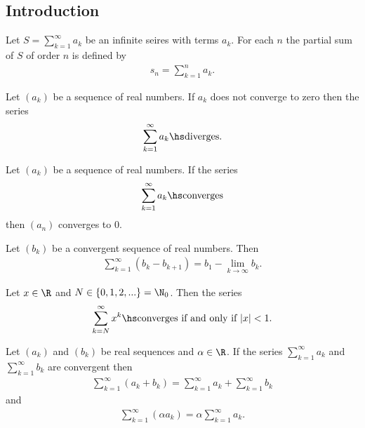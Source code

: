 \documentclass{article}
\begin{document}
\subsection{Introduction}

\begin{definition}
	Let $S=\sum_{k=1}^\infty a_k$ be an infinite seires with terms $a_k$.
	For each $n$ the partial sum of $S$ of order $n$ is defined by
	\begin{align*}
		s_n = \sum_{k=1}^n a_k.
	\end{align*}
\end{definition}

\setcounter{theorem}{6}
\begin{theorem}
	Let $(a_k)$ be a sequence of real numbers. If $a_k$ does not
	converge to zero then the series
	\begin{align*}
		\sum_{k=1}^\infty a_k\hs\text{diverges}.
	\end{align*}
\end{theorem}

\begin{theorem}
	Let $(a_k)$ be a sequence of real numbers. If the series
	\begin{align*}
		\sum_{k=1}^\infty a_k\hs\text{converges}
	\end{align*}
	then $(a_n)$ converges to $0$.
\end{theorem}

\begin{theorem}
	Let $(b_k)$ be a convergent sequence of real numbers. Then
	\begin{align*}
		\sum_{k=1}^\infty (b_k - b_{k+1})=b_1-\lim_{k\to\infty}b_k.
	\end{align*}
\end{theorem}

\setcounter{theorem}{10}
\begin{theorem}
	Let $x\in\R$ and $N\in\{0,1,2,...\}=\N_0$. Then the series
	\begin{align*}
		\sum_{k=N}^\infty x^k\hs\text{converges if and only if }|x|<1.
	\end{align*}
\end{theorem}

\begin{theorem}
	Let $(a_k)$ and $(b_k)$ be real sequences and $\alpha\in\R$. If the
	series $\sum_{k=1}^\infty a_k$ and $\sum_{k=1}^\infty b_k$ are convergent
	then
	\begin{align*}
		\sum_{k=1}^\infty (a_k+b_k)=\sum_{k=1}^\infty a_k + \sum_{k=1}^\infty b_k
	\end{align*}
	and
	\begin{align*}
		\sum_{k=1}^\infty (\alpha a_k)=\alpha \sum_{k=1}^\infty a_k.
	\end{align*}
\end{theorem}
\end{document}
